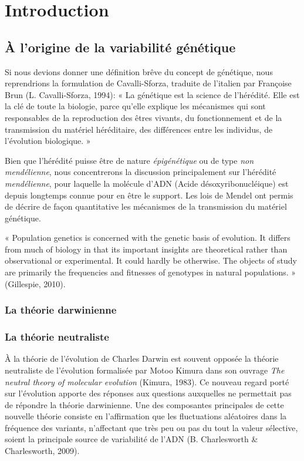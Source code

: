 \documentclass[12pt,twoside]{ugathesis}
\begin{document}
  \chapter{Introduction}\label{introduction}
  
  \section{À l'origine de la variabilité
  génétique}\label{a-lorigine-de-la-variabilite-genetique}
  
  Si nous devions donner une définition brêve du concept de génétique,
  nous reprendrions la formulation de Cavalli-Sforza, traduite de
  l'italien par Françoise Brun (L. Cavalli-Sforza, 1994): « La génétique
  est la science de l'hérédité. Elle est la clé de toute la biologie,
  parce qu'elle explique les mécanismes qui sont responsables de la
  reproduction des êtres vivants, du fonctionnement et de la transmission
  du matériel héréditaire, des différences entre les individus, de
  l'évolution biologique. »
  
  Bien que l'hérédité puisse être de nature \textit{épigénétique} ou de
  type \textit{non mendélienne}, nous concentrerons la discussion
  principalement sur l'hérédité \textit{mendélienne}, pour laquelle la
  molécule d'ADN (Acide désoxyribonucléique) est depuis longtemps connue
  pour en être le support. Les lois de Mendel ont permis de décrire de
  façon quantitative les mécanismes de la transmission du matériel
  génétique.
  
  « Population genetics is concerned with the genetic basis of evolution.
  It differs from much of biology in that its important insights are
  theoretical rather than observational or experimental. It could hardly
  be otherwise. The objects of study are primarily the frequencies and
  fitnesses of genotypes in natural populations. » (Gillespie, 2010).
  
  \subsection{La théorie darwinienne}\label{la-theorie-darwinienne}
  
  \subsection{La théorie neutraliste}\label{la-theorie-neutraliste}
  
  À la théorie de l'évolution de Charles Darwin est souvent opposée la
  théorie neutraliste de l'évolution formalisée par Motoo Kimura dans son
  ouvrage \textit{The neutral theory of molecular evolution} (Kimura,
  1983). Ce nouveau regard porté sur l'évolution apporte des réponses aux
  questions auxquelles ne permettait pas de répondre la théorie
  darwinienne. Une des composantes principales de cette nouvelle théorie
  consiste en l'affirmation que les fluctuations aléatoires dans la
  fréquence des variants, n'affectant que très peu ou pas du tout la
  valeur sélective, soient la principale source de variabilité de l'ADN
  (B. Charlesworth \& Charlesworth, 2009).
  
\end{document}
